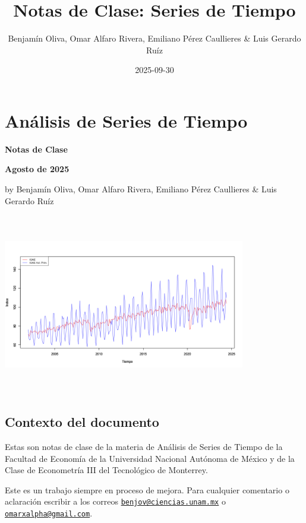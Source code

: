 \documentclass[
]{book}
\title{Notas de Clase: Series de Tiempo}
\author{Benjamín Oliva, Omar Alfaro Rivera, Emiliano Pérez Caullieres \& Luis Gerardo Ruíz}
\date{2025-09-30}
\begin{document}
\maketitle

{
\setcounter{tocdepth}{1}
\tableofcontents
}
\hypertarget{anuxe1lisis-de-series-de-tiempo}{%
\chapter*{Análisis de Series de Tiempo}\label{anuxe1lisis-de-series-de-tiempo}}

\textbf{Notas de Clase}

\textbf{Agosto de 2025}

by Benjamín Oliva, Omar Alfaro Rivera, Emiliano Pérez Caullieres \& Luis Gerardo Ruíz

\includegraphics[width=4.16667in,height=3.125in]{Portada.jpg}

\hypertarget{contexto-del-documento}{%
\section*{Contexto del documento}\label{contexto-del-documento}}

Estas son notas de clase de la materia de Análisis de Series de Tiempo de la Facultad de Economía de la Universidad Nacional Autónoma de México y de la Clase de Econometría III del Tecnológico de Monterrey.

Este es un trabajo siempre en proceso de mejora. Para cualquier comentario o aclaración escribir a los correos \href{mailto:benjov@ciencias.unam.mx}{\nolinkurl{benjov@ciencias.unam.mx}} o \href{mailto:omarxalpha@gmail.com}{\nolinkurl{omarxalpha@gmail.com}}.
\end{document}
